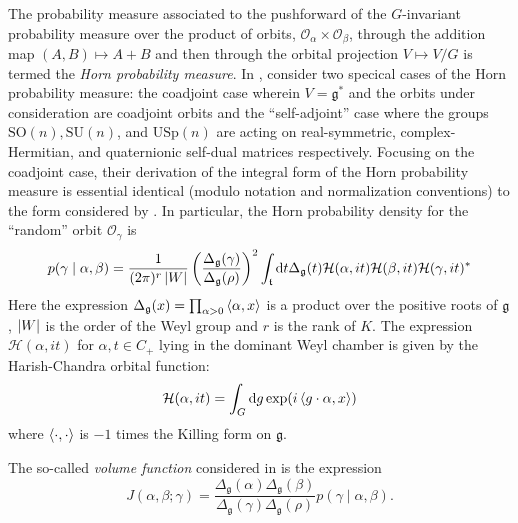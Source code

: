 \documentclass[notitlepage]{article}
\begin{document}
The probability measure associated to the pushforward of the $G$-invariant probability measure over the product of orbits, $\mathcal O_{\alpha} \times \mathcal O_{\beta}$, through the addition map $(A,B) \mapsto A+B$ and then through the orbital projection $V \mapsto V/G$ is termed the \textit{Horn probability measure}.
In \cite{coquereaux2018orbital}, \citeauthor{coquereaux2018orbital} consider two specical cases of the Horn probability measure: the coadjoint case wherein $V = \mathfrak g^{*}$ and the orbits under consideration are coadjoint orbits and the ``self-adjoint'' case where the groups $\mathrm{SO}(n), \mathrm{SU}(n)$, and $\mathrm{USp}(n)$ are acting on real-symmetric, complex-Hermitian, and quaternionic self-dual matrices respectively.
Focusing on the coadjoint case, their derivation of the integral form of the Horn probability measure is essential identical (modulo notation and normalization conventions) to the form considered by \citeauthor{klyachko2000random} \cite{klyachko2000random}.
In particular, the Horn probability density for the ``random'' orbit $\mathcal O_{\gamma}$ is
\begin{equation}
    p(\gamma \mid \alpha, \beta) = \frac{1}{(2\pi)^{r} \left|W\right|} \left(\frac{\Delta_{\mathfrak g}(\gamma)}{\Delta_{\mathfrak g}(\rho)}\right)^{2} \int_{\mathfrak t} \mathrm{d} t \Delta_{\mathfrak g}(t)\mathcal H(\alpha, i t)\mathcal H(\beta, i t)\mathcal H(\gamma, i t)^{*}
\end{equation}
Here the expression $\Delta_{\mathfrak g}(x) = \prod_{\alpha > 0} \braket{\alpha, x}$ is a product over the positive roots of $\mathfrak g$, $\left|W\right|$ is the order of the Weyl group and $r$ is the rank of $K$.
The expression $\mathcal H(\alpha, i t)$ for $\alpha, t \in C_+$ lying in the dominant Weyl chamber is given by the Harish-Chandra orbital function:
\begin{equation}
    \mathcal H(\alpha, i t) = \int_{G} \mathrm{d} g \exp(i \braket{g \cdot \alpha, x})
\end{equation}
where $\braket{\cdot, \cdot}$ is $-1$ times the Killing form on $\mathfrak g$.

The so-called \textit{volume function} considered in \cite{coquereaux2018orbital} is the expression
\begin{equation}
    J(\alpha, \beta; \gamma) = \frac{\Delta_{\mathfrak{g}}(\alpha)\Delta_{\mathfrak{g}}(\beta)}{\Delta_{\mathfrak{g}}(\gamma)\Delta_{\mathfrak{g}}(\rho)} p(\gamma \mid \alpha, \beta).
\end{equation}
\end{document}
